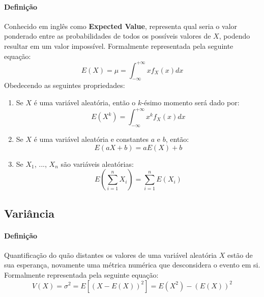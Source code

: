 \documentclass{article}
\begin{document}
            \paragraph{Definição}Conhecido em inglês como \textbf{Expected Value}, representa qual seria o valor ponderado entre as probabilidades de todos os possíveis valores de $X$, podendo resultar em um valor impossível. Formalmente representada pela seguinte equação:
                \begin{equation}
                    \boxed{
                        E(X) = \mu = 
                        \int_{-\infty}^{+\infty} x f_{X}(x) dx
                    }
                \end{equation}
            Obedecendo as seguintes propriedades:
                \begin{enumerate}[rightmargin = \leftmargin, noitemsep]
                    \item Se $X$ é uma variável aleatória, então o $k$-ésimo momento será dado por:
                        \begin{equation}
                            \boxed{
                                E(X^{k}) = 
                                \int_{-\infty}^{+\infty} x^{k} f_{X}(x) dx
                            }
                        \end{equation}
                    \item Se $X$ é uma variável aleatória e constantes $a$ e $b$, então:
                        \begin{equation}
                            \boxed{
                                E(a X + b) = a E(X) + b
                            }
                        \end{equation}
                    \item Se $X_{1}$, ..., $X_{n}$ são variáveis aleatórias:
                        \begin{equation}
                            \boxed{
                                E \left( \sum_{i=1}^{n} X_{i} \right) = \sum_{i=1}^{n} E(X_{i})
                            }
                        \end{equation}
                \end{enumerate}

        \subsection{Variância}
            \paragraph{Definição}Quantificação do quão distantes os valores de uma variável aleatória $X$ estão de sua esperança, novamente uma métrica numérica que desconsidera o evento em si. Formalmente representada pela seguinte equação:
                \begin{equation}
                    \boxed{
                        V(X) = \sigma^{2} = 
                        E[(X - E(X))^{2}] =
                        E(X^{2}) - (E(X))^{2}
                    }
                \end{equation}
\end{document}
